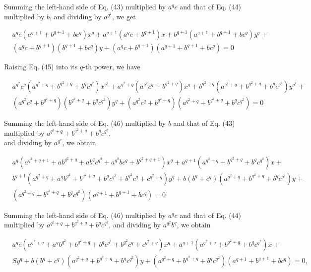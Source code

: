 \documentclass[10pt]{article}
\begin{document}
Summing the left-hand side of Eq. (43) multiplied by $a^{q} c$ and that of Eq. (44) multiplied by $b$, and dividing by $a^{q^{2}}$, we get


\begin{align*}
& a^{q} c\left(a^{q+1}+b^{q+1}+b c^{q}\right) x^{q}+a^{q+1}\left(a^{q} c+b^{q+1}\right) x+b^{q+1}\left(a^{q+1}+b^{q+1}+b c^{q}\right) y^{q}+ \\
& \left(a^{q} c+b^{q+1}\right)\left(b^{q+1}+b c^{q}\right) y+\left(a^{q} c+b^{q+1}\right)\left(a^{q+1}+b^{q+1}+b c^{q}\right)=0 \tag{45}
\end{align*}


Raising Eq. (45) into its $q$-th power, we have


\begin{align*}
& a^{q^{2}} c^{q}\left(a^{q^{2}+q}+b^{q^{2}+q}+b^{q} c^{q^{2}}\right) x^{q^{2}}+a^{q^{2}+q}\left(a^{q^{2}} c^{q}+b^{q^{2}+q}\right) x^{q}+b^{q^{2}+q}\left(a^{q^{2}+q}+b^{q^{2}+q}+b^{q} c^{q^{2}}\right) y^{q^{2}}+ \\
& \left(a^{q^{2}} c^{q}+b^{q^{2}+q}\right)\left(b^{q^{2}+q}+b^{q} c^{q^{2}}\right) y^{q}+\left(a^{q^{2}} c^{q}+b^{q^{2}+q}\right)\left(a^{q^{2}+q}+b^{q^{2}+q}+b^{q} c^{q^{2}}\right)=0 \tag{46}
\end{align*}


Summing the left-hand side of Eq. (46) multiplied by $b$ and that of Eq. (43) multiplied by $a^{q^{2}+q}+b^{q^{2}+q}+b^{q} c^{q^{2}}$,\\
and dividing by $a^{q^{2}}$, we obtain


\begin{align*}
& a^{q}\left(a^{q^{2}+q+1}+a b^{q^{2}+q}+a b^{q} c^{q^{2}}+a^{q^{2}} b c^{q}+b^{q^{2}+q+1}\right) x^{q}+a^{q+1}\left(a^{q^{2}+q}+b^{q^{2}+q}+b^{q} c^{q^{2}}\right) x+ \\
& b^{q+1}\left(a^{q^{2}+q}+a^{q} b^{q^{2}}+b^{q^{2}+q}+b^{q} c^{q^{2}}+b^{q^{2}} c^{q}+c^{q^{2}+q}\right) y^{q}+b\left(b^{q}+c^{q}\right)\left(a^{q^{2}+q}+b^{q^{2}+q}+b^{q} c^{q^{2}}\right) y+ \\
& \left(a^{q^{2}+q}+b^{q^{2}+q}+b^{q} c^{q^{2}}\right)\left(a^{q+1}+b^{q+1}+b c^{q}\right)=0 \tag{47}
\end{align*}


Summing the left-hand side of Eq. (46) multiplied by $a^{q} c$ and that of Eq. (44) multiplied by $a^{q^{2}+q}+b^{q^{2}+q}+ b^{q} c^{q^{2}}$, and dividing by $a^{q^{2}} b^{q}$, we obtain


\begin{align*}
& a^{q} c\left(a^{q^{2}+q}+a^{q} b^{q^{2}}+b^{q^{2}+q}+b^{q} c^{q^{2}}+b^{q^{2}} c^{q}+c^{q^{2}+q}\right) x^{q}+a^{q+1}\left(a^{q^{2}+q}+b^{q^{2}+q}+b^{q} c^{q^{2}}\right) x+ \\
& S y^{q}+b\left(b^{q}+c^{q}\right)\left(a^{q^{2}+q}+b^{q^{2}+q}+b^{q} c^{q^{2}}\right) y+\left(a^{q^{2}+q}+b^{q^{2}+q}+b^{q} c^{q^{2}}\right)\left(a^{q+1}+b^{q+1}+b c^{q}\right)=0, \tag{48}
\end{align*}
\end{document}
